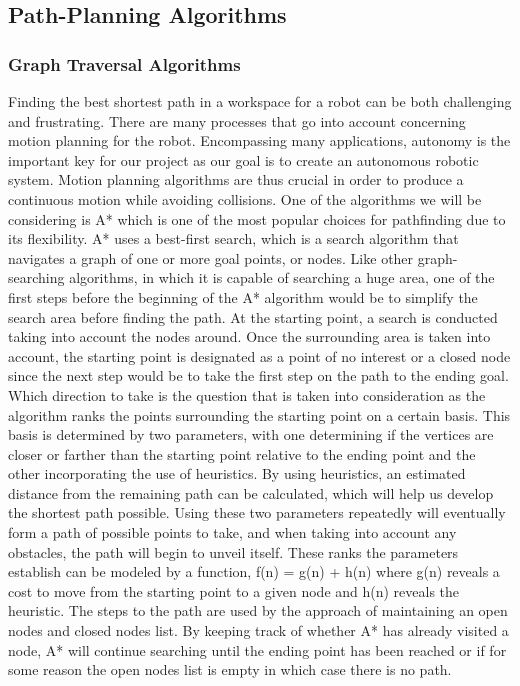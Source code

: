 \documentclass[titlepage]{article}
\begin{document}
\subsection{Path-Planning Algorithms}
\subsubsection{Graph Traversal Algorithms}
Finding the best shortest path in a workspace for a robot can be both challenging and frustrating. There are many processes that go into account concerning motion planning for the robot. Encompassing many applications, autonomy is the important key for our project as our goal is to create an autonomous robotic system. Motion planning algorithms are thus crucial in order to produce a continuous motion while avoiding collisions. One of the algorithms we will be considering is A* which is one of the most popular choices for pathfinding due to its flexibility. A* uses a best-first search, which is a search algorithm that navigates a graph of one or more goal points, or nodes. Like other graph-searching algorithms, in which it is capable of searching a huge area, one of the first steps before the beginning of the A* algorithm would be to simplify the search area before finding the path. At the starting point, a search is conducted taking into account the nodes around. Once the surrounding area is taken into account, the starting point is designated as a point of no interest or a closed node since the next step would be to take the first step on the path to the ending goal.
Which direction to take is the question that is taken into consideration as the algorithm ranks the points surrounding the starting point on a certain basis. This basis is determined by two parameters, with one determining if the vertices are closer or farther than the starting point relative to the ending point and the other incorporating the use of heuristics. By using heuristics, an estimated distance from the remaining path can be calculated, which will help us develop the shortest path possible. Using these two parameters repeatedly will eventually form a path of possible points to take, and when taking into account any obstacles, the path will begin to unveil itself. These ranks the parameters establish can be modeled by a function, f(n) = g(n) + h(n) where g(n) reveals a cost to move from the starting point to a given node and h(n) reveals the heuristic. The steps to the path are used by the approach of maintaining an open nodes and closed nodes list. By keeping track of whether A* has already visited a node, A* will continue searching until the ending point has been reached or if for some reason the open nodes list is empty in which case there is no path.
\end{document}
